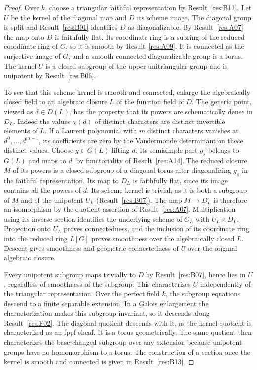 \documentclass[11pt,a4paper,openany,oneside]{book}
\theoremstyle{resultstyle}
\theoremstyle{definition}
\numberwithin{equation}{chapter}
\begin{document}
\begin{proof}
Over \(\bar k\), choose a triangular faithful representation by
Result~\ref{res:B11}. Let \(U\) be the kernel of the diagonal map
and \(D\) its scheme image. The diagonal group is split and
Result~\ref{res:B01} identifies \(D\) as diagonalizable.
By Result~\ref{res:A07} the map onto \(D\) is faithfully flat.
Its coordinate ring is a subring of the reduced coordinate ring
of \(G\), so it is smooth by Result~\ref{res:A09}. It is connected
as the surjective image of \(G\), and a smooth connected
diagonalizable group is a torus. The kernel \(U\) is a closed
subgroup of the upper unitriangular group and is unipotent by
Result~\ref{res:B06}.

To see that this scheme kernel is smooth and connected, enlarge
the algebraically closed field to an algebraic closure \(L\)
of the function field of \(D\). The generic point, viewed as
\(d\in D(L)\), has the property that its powers are schematically
dense in \(D_L\). Indeed the values \(\chi(d)\) of distinct
characters are distinct invertible elements of \(L\). If a
Laurent polynomial with \(m\) distinct characters vanishes at
\(d^0,\ldots,d^{m-1}\), its coefficients are zero by the
Vandermonde determinant on these distinct values.
Choose \(g\in G(L)\) lifting \(d\). Its semisimple part \(g_s\)
belongs to \(G(L)\) and maps to \(d\), by functoriality of
Result~\ref{res:A14}. The reduced closure \(M\) of its powers
is a closed subgroup of a diagonal torus after diagonalizing
\(g_s\) in the faithful representation. Its map to \(D_L\) is
faithfully flat, since its image contains all the powers of \(d\).
Its scheme kernel is trivial, as it is both a subgroup of \(M\)
and of the unipotent \(U_L\) (Result~\ref{res:B07}).
The map \(M\to D_L\) is therefore an isomorphism by the
quotient assertion of Result~\ref{res:A07}. Multiplication
using its inverse section identifies the underlying scheme
of \(G_L\) with \(U_L\times D_L\). Projection onto \(U_L\)
proves connectedness, and the inclusion of its coordinate
ring into the reduced ring \(L[G]\) proves smoothness over
the algebraically closed \(L\). Descent gives smoothness and
geometric connectedness of \(U\) over the original algebraic
closure.

Every unipotent subgroup maps trivially to \(D\) by
Result~\ref{res:B07}, hence lies in \(U\), regardless of
smoothness of the subgroup. This characterizes \(U\)
independently of the triangular representation. Over the
perfect field \(k\), the subgroup equations descend to a finite
separable extension. In a Galois enlargement the characterization
makes this subgroup invariant, so it descends along
Result~\ref{res:F02}. The diagonal quotient descends with it,
as the kernel quotient is characterized as an fppf sheaf.
It is a torus geometrically. The same quotient then
characterizes the base-changed subgroup over any extension
because unipotent groups have no homomorphism to a torus.
The construction of a section once the kernel is smooth
and connected is given in Result~\ref{res:B13}.


\end{proof}
\end{document}
